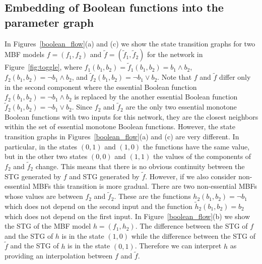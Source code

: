 \documentclass[12pt, notitlepage]{amsart}
\theoremstyle{definition}
\begin{document}
  \subsection{Embedding of Boolean functions into the parameter graph}

  In Figures~\ref{boolean_flow}(a) and (c) we show the state transition graphs for two MBF models $f = (f_1, f_2)$ and $\tilde{f} = (\tilde{f}_1, \tilde{f}_2)$ for the network in Figure~\ref{fig:toggle}, where $f_1(b_1, b_2) = \tilde{f}_1(b_1, b_2) = b_1 \wedge b_2$, $f_2(b_1, b_2) = \neg b_1 \wedge b_2$, and $\tilde{f}_2(b_1, b_2) = \neg b_1 \vee b_2$. Note that $f$ and $\tilde{f}$ differ only in the second component where the essential Boolean function $f_2(b_1, b_2) = \neg b_1 \wedge b_2$ is replaced by the another essential Boolean function $\tilde{f}_2(b_1, b_2) = \neg b_1 \vee b_2$. Since $f_2$ and $\tilde{f}_2$ are the only two essential monotone Boolean functions with two inputs for this network, they are the closest neighbors within the set of essential monotone Boolean functions. However, the state transition graphs in Figures~\ref{boolean_flow}(a) and (c) are very different. In particular, in the states $(0, 1)$ and $(1, 0)$ the functions have the same value, but in the other two states $(0, 0)$ and $(1, 1)$ the values of the components of $f_2$ and $\tilde{f}_2$ change. This means that there is no obvious continuity between the STG generated by $f$ and STG generated by $\tilde{f}$. However, if we also consider non-essential MBFs this transition is more gradual. There are two non-essential MBFs whose values are between $f_2$ and $\tilde{f}_2$. These are the functions $h_2 (b_1, b_2) = \neg b_1$ which does not depend on the second input and the function $\tilde{h}_2 (b_1, b_2) = b_2$ which does not depend on the first input. In Figure~\ref{boolean_flow}(b) we show the STG of the MBF model $h = (f_1, h_2)$. The difference between the STG of $f$ and the STG of $h$ is in the state $(1, 0)$ while the difference between the STG of $\tilde{f}$ and the STG of $h$ is in the state $(0, 1)$. Therefore we can interpret $h$ as providing an interpolation  between $f$ and $\tilde{f}$.
\end{document}
